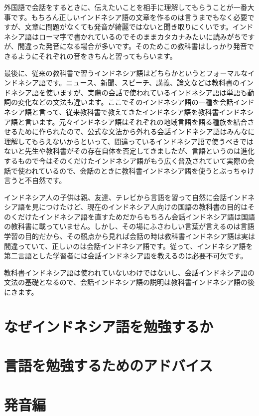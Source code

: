 \documentclass[uplatex]{jsarticle}
\begin{document}
外国語で会話をするときに、伝えたいことを相手に理解してもらうことが一番大事です。もちろん正しいインドネシア語の文章を作るのは言うまでもなく必要ですが、文章に問題がなくても発音が綺麗ではないと聞き取りにくいです。インドネシア語はローマ字で書かれているのでそのままカタカナみたいに読みがちですが、間違った発音になる場合が多いです。そのためこの教科書はしっかり発音できるようにそれぞれの音をきちんと習ってもらいます。

最後に、従来の教科書で習うインドネシア語はどちらかというとフォーマルなインドネシア語です。ニュース、新聞、スピーチ、講義、論文などは教科書のインドネシア語を使いますが、実際の会話で使われているインドネシア語は単語も動詞の変化などの文法も違います。ここでそのインドネシア語の一種を会話インドネシア語と言って、従来教科書で教えてきたインドネシア語を教科書インドネシア語と言います。元々インドネシア語はそれぞれの地域言語を語る種族を結合させるために作られたので、公式な文法から外れる会話インドネシア語はみんなに理解してもらえないからといって、間違っているインドネシア語で使うべきではないと先生や教科書がその存在自体を否定してきましたが、言語というのは進化するもので今はそのくだけたインドネシア語がもう広く普及されていて実際の会話で使われているので、会話のときに教科書インドネシア語を使うとぶっちゃけ言うと不自然です。

インドネシア人の子供は親、友達、テレビから言語を習って自然に会話インドネシア語を見につけたけど、現在のインドネシア人向けの国語の教科書の目的はそのくだけたインドネシア語を直すためだからもちろん会話インドネシア語は国語の教科書に載っていません。しかし、その場にふさわしい言葉が言えるのは言語学習の目的だから、その観点から見れば会話の時は教科書インドネシア語は実は間違っていて、正しいのは会話インドネシア語です。従って、インドネシア語を第二言語とした学習者には会話インドネシア語を教えるのは必要不可欠です。

教科書インドネシア語は使われていないわけではないし、会話インドネシア語の文法の基礎となるので、会話インドネシア語の説明は教科書インドネシア語の後にきます。

\section{なぜインドネシア語を勉強するか}

\section{言語を勉強するためのアドバイス}

\section{発音編}
\end{document}
